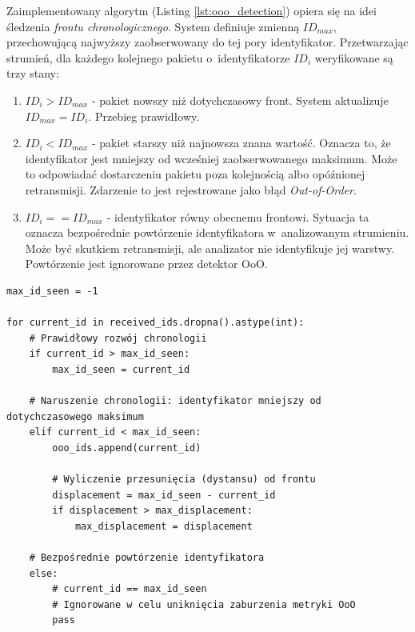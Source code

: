 Zaimplementowany algorytm (Listing \ref{lst:ooo_detection}) opiera się na idei śledzenia \textit{frontu chronologicznego}.
System definiuje zmienną $ID_{max}$, przechowującą najwyższy zaobserwowany do tej pory identyfikator.
Przetwarzając strumień, dla każdego kolejnego pakietu o~identyfikatorze $ID_i$ weryfikowane są trzy stany:
\begin{enumerate}
    \item $ID_i > ID_{max}$ - pakiet nowszy niż dotychczasowy front.
          System aktualizuje $ID_{max} = ID_i$.
          Przebieg prawidłowy.
    \item $ID_i < ID_{max}$ - pakiet starszy niż najnowsza znana wartość.
          Oznacza to, że identyfikator jest mniejszy od wcześniej zaobserwowanego maksimum.
          Może to odpowiadać dostarczeniu pakietu poza kolejnością albo opóźnionej retransmisji.
          Zdarzenie to jest rejestrowane jako błąd \textit{Out-of-Order}.
    \item $ID_i == ID_{max}$ - identyfikator równy obecnemu frontowi.
          Sytuacja ta oznacza bezpośrednie powtórzenie identyfikatora w~analizowanym strumieniu.
          Może być skutkiem retransmisji, ale analizator nie identyfikuje jej warstwy.
          Powtórzenie jest ignorowane przez detektor OoO.
\end{enumerate}

\begin{listing}[htbp]
    \caption{Algorytm śledzenia frontu chronologicznego z~ignorowaniem bezpośrednich powtórzeń identyfikatora (\texttt{out\_of\_order.py}) \cite{espy_nexus_python_host}.}
    \label{lst:ooo_detection}
    \begin{verbatim}
max_id_seen = -1

for current_id in received_ids.dropna().astype(int):
    # Prawidłowy rozwój chronologii
    if current_id > max_id_seen:
        max_id_seen = current_id
        
    # Naruszenie chronologii: identyfikator mniejszy od dotychczasowego maksimum
    elif current_id < max_id_seen:
        ooo_ids.append(current_id)
        
        # Wyliczenie przesunięcia (dystansu) od frontu
        displacement = max_id_seen - current_id
        if displacement > max_displacement:
            max_displacement = displacement

    # Bezpośrednie powtórzenie identyfikatora
    else:
        # current_id == max_id_seen
        # Ignorowane w celu uniknięcia zaburzenia metryki OoO
        pass
\end{verbatim}
\end{listing}

